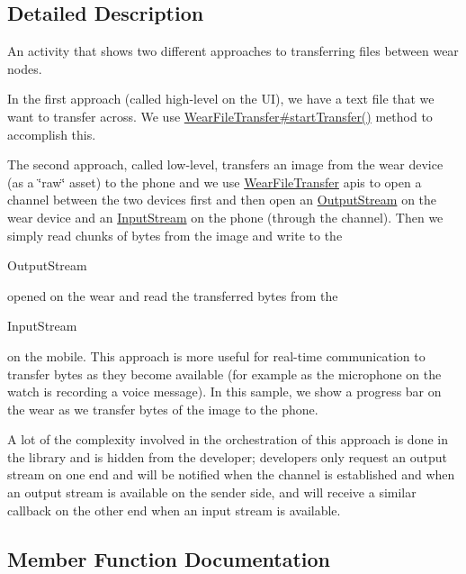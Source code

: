 \subsection{Detailed Description}
An activity that shows two different approaches to transferring files between wear nodes.

In the first approach (called high-\/level on the UI), we have a text file that we want to transfer across. We use \hyperlink{classcom_1_1google_1_1devrel_1_1wcl_1_1connectivity_1_1WearFileTransfer_abdabe46833a251759e295e4de2cc3c95}{Wear\+File\+Transfer\#start\+Transfer()} method to accomplish this.

The second approach, called low-\/level, transfers an image from the wear device (as a \char`\"{}raw\char`\"{} asset) to the phone and we use \hyperlink{}{Wear\+File\+Transfer} apis to open a channel between the two devices first and then open an \hyperlink{}{Output\+Stream} on the wear device and an \hyperlink{}{Input\+Stream} on the phone (through the channel). Then we simply read chunks of bytes from the image and write to the
\begin{DoxyCode}
OutputStream 
\end{DoxyCode}
 opened on the wear and read the transferred bytes from the 
\begin{DoxyCode}
InputStream 
\end{DoxyCode}
 on the mobile. This approach is more useful for real-\/time communication to transfer bytes as they become available (for example as the microphone on the watch is recording a voice message). In this sample, we show a progress bar on the wear as we transfer bytes of the image to the phone.

A lot of the complexity involved in the orchestration of this approach is done in the library and is hidden from the developer; developers only request an output stream on one end and will be notified when the channel is established and when an output stream is available on the sender side, and will receive a similar callback on the other end when an input stream is available. 

\subsection{Member Function Documentation}
